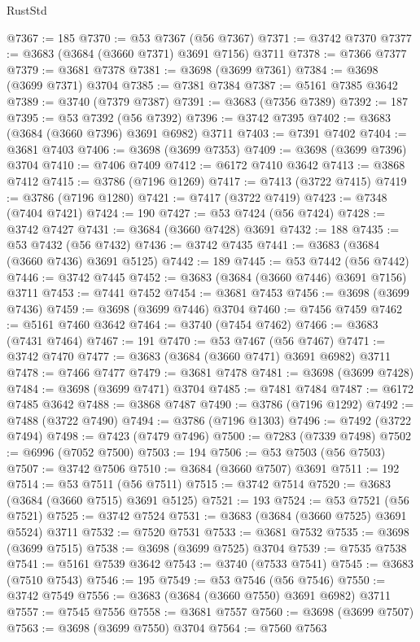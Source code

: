\begin{lexlean}{RustStd}
\begin{coremodule}
@7367 := 185
@7370 := @53 @7367 (@56 @7367)
@7371 := @3742 @7370
@7377 := @3683 (@3684 (@3660 @7371) @3691 @7156) @3711
@7378 := @7366 @7377
@7379 := @3681 @7378
@7381 := @3698 (@3699 @7361)
@7384 := @3698 (@3699 @7371) @3704
@7385 := @7381 @7384
@7387 := @5161 @7385 @3642
@7389 := @3740 (@7379 @7387)
@7391 := @3683 (@7356 @7389)
@7392 := 187
@7395 := @53 @7392 (@56 @7392)
@7396 := @3742 @7395
@7402 := @3683 (@3684 (@3660 @7396) @3691 @6982) @3711
@7403 := @7391 @7402
@7404 := @3681 @7403
@7406 := @3698 (@3699 @7353)
@7409 := @3698 (@3699 @7396) @3704
@7410 := @7406 @7409
@7412 := @6172 @7410 @3642
@7413 := @3868 @7412
@7415 := @3786 (@7196 @1269)
@7417 := @7413 (@3722 @7415)
@7419 := @3786 (@7196 @1280)
@7421 := @7417 (@3722 @7419)
@7423 := @7348 (@7404 @7421)
@7424 := 190
@7427 := @53 @7424 (@56 @7424)
@7428 := @3742 @7427
@7431 := @3684 (@3660 @7428) @3691
@7432 := 188
@7435 := @53 @7432 (@56 @7432)
@7436 := @3742 @7435
@7441 := @3683 (@3684 (@3660 @7436) @3691 @5125)
@7442 := 189
@7445 := @53 @7442 (@56 @7442)
@7446 := @3742 @7445
@7452 := @3683 (@3684 (@3660 @7446) @3691 @7156) @3711
@7453 := @7441 @7452
@7454 := @3681 @7453
@7456 := @3698 (@3699 @7436)
@7459 := @3698 (@3699 @7446) @3704
@7460 := @7456 @7459
@7462 := @5161 @7460 @3642
@7464 := @3740 (@7454 @7462)
@7466 := @3683 (@7431 @7464)
@7467 := 191
@7470 := @53 @7467 (@56 @7467)
@7471 := @3742 @7470
@7477 := @3683 (@3684 (@3660 @7471) @3691 @6982) @3711
@7478 := @7466 @7477
@7479 := @3681 @7478
@7481 := @3698 (@3699 @7428)
@7484 := @3698 (@3699 @7471) @3704
@7485 := @7481 @7484
@7487 := @6172 @7485 @3642
@7488 := @3868 @7487
@7490 := @3786 (@7196 @1292)
@7492 := @7488 (@3722 @7490)
@7494 := @3786 (@7196 @1303)
@7496 := @7492 (@3722 @7494)
@7498 := @7423 (@7479 @7496)
@7500 := @7283 (@7339 @7498)
@7502 := @6996 (@7052 @7500)
@7503 := 194
@7506 := @53 @7503 (@56 @7503)
@7507 := @3742 @7506
@7510 := @3684 (@3660 @7507) @3691
@7511 := 192
@7514 := @53 @7511 (@56 @7511)
@7515 := @3742 @7514
@7520 := @3683 (@3684 (@3660 @7515) @3691 @5125)
@7521 := 193
@7524 := @53 @7521 (@56 @7521)
@7525 := @3742 @7524
@7531 := @3683 (@3684 (@3660 @7525) @3691 @5524) @3711
@7532 := @7520 @7531
@7533 := @3681 @7532
@7535 := @3698 (@3699 @7515)
@7538 := @3698 (@3699 @7525) @3704
@7539 := @7535 @7538
@7541 := @5161 @7539 @3642
@7543 := @3740 (@7533 @7541)
@7545 := @3683 (@7510 @7543)
@7546 := 195
@7549 := @53 @7546 (@56 @7546)
@7550 := @3742 @7549
@7556 := @3683 (@3684 (@3660 @7550) @3691 @6982) @3711
@7557 := @7545 @7556
@7558 := @3681 @7557
@7560 := @3698 (@3699 @7507)
@7563 := @3698 (@3699 @7550) @3704
@7564 := @7560 @7563

\end{coremodule}
\end{lexlean}

